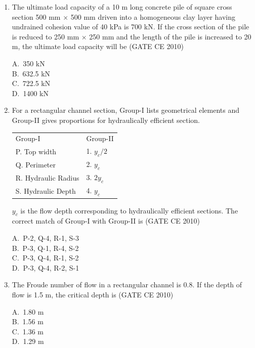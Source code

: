 \documentclass[journal,12pt,onecolumn]{exam}
\theoremstyle{remark}
\begin{document}
\begin{enumerate}
\noindent\item The ultimate load capacity of a 10 m long concrete pile of square cross section 500 mm $\times$ 500 mm driven into a homogeneous clay layer having undrained cohesion value of 40 kPa is 700 kN. If the cross section of the pile is reduced to 250 mm $\times$ 250 mm and the length of the pile is increased to 20 m, the ultimate load capacity will be
\hfill{(GATE CE 2010)}
\begin{multicols}{4}
A.\ 350 kN \\
B.\ 632.5 kN \\
C.\ 722.5 kN \\
D.\ 1400 kN
\end{multicols}

\setlength{\parindent}{0pt}
\setlength{\parskip}{0.5cm}


\noindent\item For a rectangular channel section, {Group-I} lists geometrical elements and {Group-II} gives proportions for hydraulically efficient section. \\[0.2cm]

\begin{table}[H]
\centering
\begin{tabular}{l l}
Group-I & Group-II  \\
P. Top width     & 1. $y_c/2$ \\
Q. Perimeter    & 2.  $y_c$     \\
R. Hydraulic Radius    & 3.  $2y_c$          \\
S. Hydraulic Depth    & 4. $y_c$
\end{tabular}
\label{table3}
\end{table}
$y_c$ is the flow depth corresponding to hydraulically efficient sections. The correct match of {Group-I} with {Group-II} is
\hfill{(GATE CE 2010)}
\begin{multicols}{4}
A.\ P-2, Q-4, R-1, S-3 \\
B.\ P-3, Q-1, R-4, S-2 \\
C.\ P-3, Q-4, R-1, S-2 \\
D.\ P-3, Q-4, R-2, S-1
\end{multicols}

\noindent\item The Froude number of flow in a rectangular channel is 0.8. If the depth of flow is 1.5 m, the critical depth is
\hfill{(GATE CE 2010)}
\begin{multicols}{4}
A.\ 1.80 m \\
B.\ 1.56 m \\
C.\ 1.36 m \\
D.\ 1.29 m
\end{multicols}


\end{enumerate}
\end{document}
